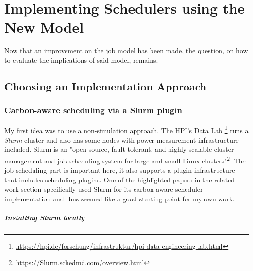\chapter{Implementing Schedulers using the New Model}

Now that an improvement on the job model has been made, the question, on how to evaluate the implications of said model, remains. 



\section{Choosing an Implementation Approach}

\subsection{Carbon-aware scheduling via a Slurm plugin}
\label{subsec:slurm_plugin}

My first idea was to use a non-simulation approach. 
The HPI's Data Lab \footnote{\url{https://hpi.de/forschung/infrastruktur/hpi-data-engineering-lab.html}} runs a \emph{Slurm} cluster and also has some nodes with power measurement infrastructure included. 
Slurm is an "open source, fault-tolerant, and highly scalable cluster management and job scheduling system for large and small Linux clusters"\footnote{\url{https://Slurm.schedmd.com/overview.html}}. 
The job scheduling part is important here, it also supports a plugin infrastructure that includes scheduling plugins. 
One of the highlighted papers\cite{inigo_goiri_greenslot_2011} in the related work section specifically used Slurm for its carbon-aware scheduler implementation and thus seemed like a good starting point for my own work.

\paragraph{Installing Slurm locally}

